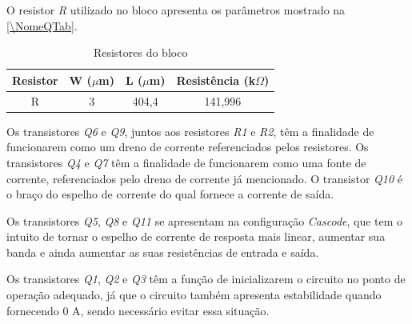 O resistor \emph{R} utilizado no bloco apresenta os par\^ametros mostrado na \autoref{\NomeQTab}.

\begin{table}[!h]
\caption{Resistores do bloco \NomeBloco}
\label{\NomeQTab}
\centering
\begin{tabular}{cccc}
\toprule
Resistor & W ($\mu$m)  & L ($\mu$m) & Resist\^encia (k$\Omega$)\\
\midrule \midrule
R & 3 & 404,4 & 141,996\\
\bottomrule
\end{tabular}
\end{table}

Os transistores \emph{Q6} e \emph{Q9}, juntos aos resistores \emph{R1} e \emph{R2}, t\^em a finalidade de funcionarem como um dreno de corrente referenciados pelos resistores. Os transistores \emph{Q4} e \emph{Q7} t\^em a finalidade de funcionarem como uma fonte de corrente, referenciados pelo dreno de corrente j\'a mencionado. O transistor \emph{Q10} \'e o braço do espelho de corrente do qual fornece a corrente de sa\'ida.

Os transistores \emph{Q5}, \emph{Q8} e \emph{Q11} se apresentam na configuração \emph{Cascode}, que tem o intuito de tornar o espelho de corrente de resposta mais linear, aumentar sua banda e ainda aumentar as suas resist\^encias de entrada e sa\'ida.

Os transistores \emph{Q1}, \emph{Q2} e \emph{Q3} t\^em a função de inicializarem o circuito no ponto de operação adequado, j\'a que o circuito tamb\'em apresenta estabilidade quando fornecendo 0 A, sendo necess\'ario evitar essa situação.
